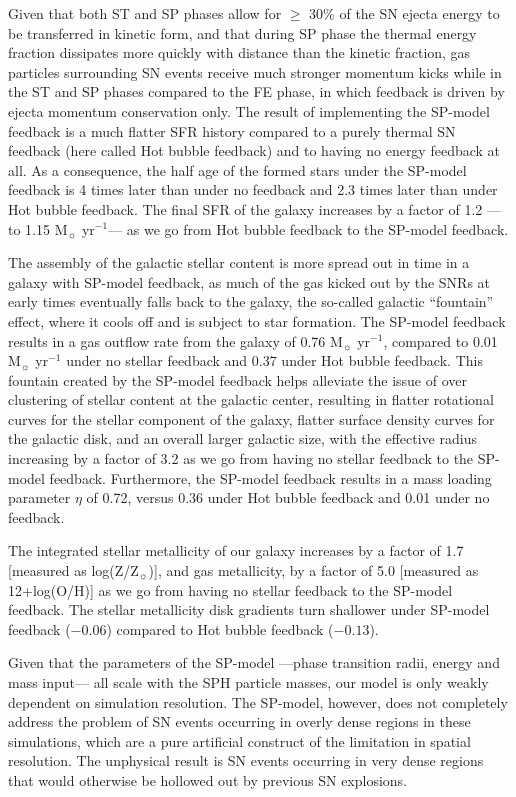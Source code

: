 \documentclass[iop]{emulateapj}
\begin{document}
Given that both ST and SP phases allow for $\geq$ 30\% of the SN ejecta energy to be transferred in kinetic form, and that during SP phase the thermal energy fraction dissipates more quickly with distance than the kinetic fraction, gas particles surrounding SN events receive much stronger momentum kicks while in the ST and SP phases compared to the FE phase, in which feedback is driven by ejecta momentum conservation only. The result of implementing the SP-model feedback is a much flatter SFR history compared to a purely thermal SN feedback (here called Hot bubble feedback) and to having no energy feedback at all. As a consequence, the half age of the formed stars under the SP-model feedback is 4 times later than under no feedback and 2.3 times later than under Hot bubble feedback. The final SFR of the galaxy increases by a factor of 1.2 ---to 1.15 M$_{\sun}$ yr$^{-1}$--- as we go from Hot bubble feedback to the SP-model feedback.

The assembly of the galactic stellar content is more spread out in time in a galaxy with SP-model feedback, as much of the gas kicked out by the SNRs at early times eventually falls back to the galaxy, the so-called galactic ``fountain'' effect, where it cools off and is subject to star formation. The SP-model feedback results in a gas outflow rate from the galaxy of 0.76 M$_{\sun}$ yr$^{-1}$, compared to 0.01 M$_{\sun}$ yr$^{-1}$ under no stellar feedback and 0.37 under Hot bubble feedback. This fountain created by the SP-model feedback helps alleviate the issue of over clustering of stellar content at the galactic center, resulting in flatter rotational curves for the stellar component of the galaxy, flatter surface density curves for the galactic disk, and an overall larger galactic size, with the effective radius increasing by a factor of 3.2 as we go from having no stellar feedback to the SP-model feedback. Furthermore, the SP-model feedback results in a mass loading parameter $\eta$ of 0.72, versus 0.36 under Hot bubble feedback and 0.01 under no feedback.

The integrated stellar metallicity of our galaxy increases by a factor of 1.7 [measured as log(Z/Z$_{\sun}$)], and gas metallicity, by a factor of 5.0 [measured as 12+log(O/H)] as we go from having no stellar feedback to the SP-model feedback. The stellar metallicity disk gradients turn shallower under SP-model feedback ($-0.06$) compared to Hot bubble feedback ($-0.13$).

Given that the parameters of the SP-model ---phase transition radii, energy and mass input--- all scale with the SPH particle masses, our model is only weakly dependent on simulation resolution. The SP-model, however, does not completely address the problem of SN events occurring in overly dense regions in these simulations, which are a pure artificial construct of the limitation in spatial resolution. The unphysical result is SN events occurring in very dense regions that would otherwise be hollowed out by previous SN explosions.
\end{document}
